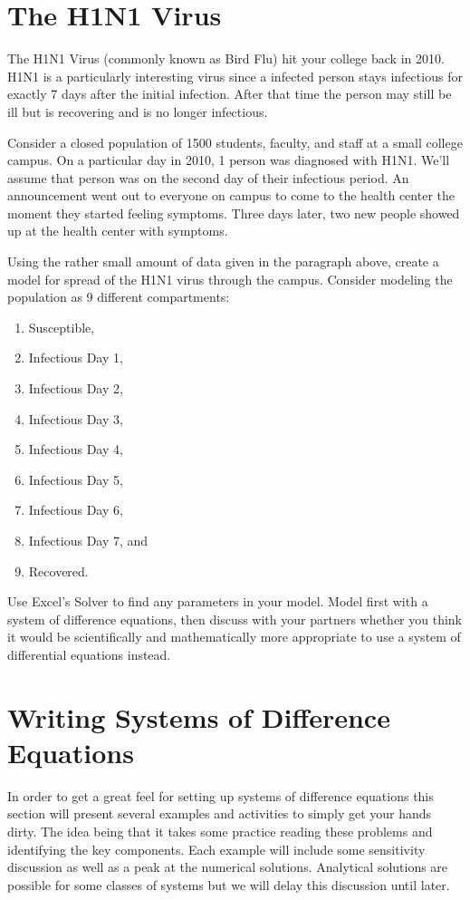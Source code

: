 \newpage\section{The H1N1 Virus}
The H1N1 Virus (commonly known as Bird Flu) hit your college back in 2010.  H1N1 is a
particularly interesting virus since a infected person stays infectious for exactly 7 days
after the initial infection.  After that time the person may still be ill but is
recovering and is no longer infectious.  

\begin{problem}
    Consider a closed population of 1500 students, faculty, and staff at a small college
    campus.  On a particular day in 2010, 1 person was diagnosed with H1N1.  We'll assume
    that person was on the second day of their infectious period.  An announcement went
    out to everyone on campus to come to the health center the moment they started feeling
    symptoms.  Three days later, two new people showed up at the health center with
    symptoms.  

    Using the rather small amount of data given in the paragraph above, create a model for
    spread of the H1N1 virus through the campus.   Consider modeling the population as 9
    different compartments:
    \begin{enumerate}
        \item Susceptible,
        \item Infectious Day 1,
        \item Infectious Day 2,
        \item Infectious Day 3,
        \item Infectious Day 4,
        \item Infectious Day 5,
        \item Infectious Day 6,
        \item Infectious Day 7, and
        \item Recovered.
    \end{enumerate}
    Use Excel's Solver to find any parameters in your model.  Model first with a system of
    difference equations, then discuss with your partners whether you think it would be
    scientifically and mathematically more appropriate to use a system of differential
    equations instead.
\end{problem}


\newpage\section{Writing Systems of Difference Equations}
In order to get a great feel for setting up systems of difference equations this section
will present several examples and activities to simply get your hands dirty.  The idea
being that it takes some practice reading these problems and identifying the key
components. Each example will include some sensitivity discussion as well as a peak at the
numerical solutions. Analytical solutions are possible for some classes of systems but we
will delay this discussion until later.

